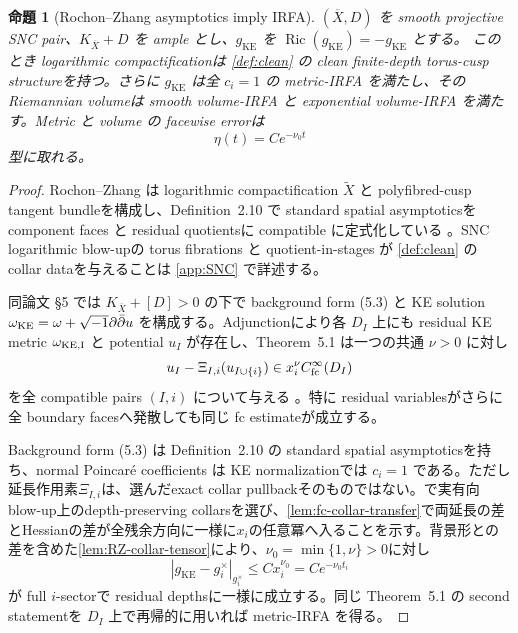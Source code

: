 \documentclass[11pt,a4paper]{ltjsarticle}
\newcommand{\Ric}{\operatorname{Ric}}
\newcommand{\ov}{\overline}
\theoremstyle{plain}
\newtheorem{proposition}[proposition]{命題}
\theoremstyle{definition}
\theoremstyle{remark}
\begin{document}
\begin{proposition}[Rochon--Zhang asymptotics imply IRFA]
\label{prop:RZ}
$(\ov X,D)$ を smooth projective SNC pair、$K_{\ov X}+D$ を ample とし、$g_{\mathrm{KE}}$ を
$\Ric(g_{\mathrm{KE}})=-g_{\mathrm{KE}}$ とする。
このとき logarithmic compactificationは \cref{def:clean} の clean finite-depth torus-cusp structureを持つ。さらに $g_{\mathrm{KE}}$ は全 $c_i=1$ の metric-IRFA を満たし、その Riemannian volumeは smooth volume-IRFA と exponential volume-IRFA を満たす。Metric と volume の facewise errorは
\[
 \eta(t)=Ce^{-\nu_0t}
\]
型に取れる。
\end{proposition}
\begin{proof}
Rochon--Zhang は logarithmic compactification $\widetilde X$ と polyfibred-cusp tangent bundleを構成し、Definition~2.10 で standard spatial asymptoticsを component faces と residual quotientsに compatible に定式化している \cite{RochonZhang}。SNC logarithmic blow-upの torus fibrations と quotient-in-stages が \cref{def:clean} の collar dataを与えることは \cref{app:SNC} で詳述する。

同論文 §5 では $K_{\ov X}+[D]>0$ の下で background form (5.3) と KE solution
$\omega_{\rm KE}=\omega+\sqrt{-1}\partial\bar\partial u$ を構成する。Adjunctionにより各 $D_I$ 上にも residual KE metric $\omega_{\rm KE,I}$ と potential $u_I$ が存在し、Theorem~5.1 は一つの共通 $\nu>0$ に対し
\begin{equation}
\label{eq:RZ-51}
 u_I-\Xi_{I,i}(u_{I\cup\{i\}})
 \in x_i^\nu C^\infty_{\rm fc}(D_I)
\end{equation}
を全 compatible pairs $(I,i)$ について与える \cite[Theorem~5.1]{RochonZhang}。特に residual variablesがさらに全 boundary facesへ発散しても同じ fc estimateが成立する。

Background form (5.3) は Definition~2.10 の standard spatial asymptoticsを持ち、normal Poincar\'e coefficients は KE normalizationでは $c_i=1$ である。ただし延長作用素$\Xi_{I,i}$は、選んだexact collar pullbackそのものではない。で実有向blow-up上のdepth-preserving collarsを選び、\cref{lem:fc-collar-transfer}で両延長の差とHessianの差が全残余方向に一様に$x_i$の任意冪へ入ることを示す。背景形との差を含めた\cref{lem:RZ-collar-tensor}により、$\nu_0=\min\{1,\nu\}>0$に対し
\[
 |g_{\mathrm{KE}}-g_i^\times|_{g_i^\times}
 \le Cx_i^{\nu_0}=Ce^{-\nu_0t_i}
\]
が full $i$-sectorで residual depthsに一様に成立する。同じ Theorem~5.1 の second statementを $D_I$ 上で再帰的に用いれば metric-IRFA を得る。


\end{proof}
\end{document}
